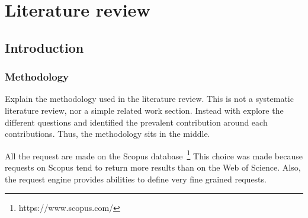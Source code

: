 \chapter{Literature review}



\section*{Introduction}
\subsection{Methodology}
Explain the methodology used in the literature review.
This is not a systematic literature review, nor a simple related work section.
Instead with explore the different questions and identified the prevalent contribution around each contributions.
Thus, the methodology sits in the middle.

All the request are made on the Scopus database~\footnote{https://www.scopus.com/}
This choice was made because requests on Scopus tend to return more results than on the Web of Science.
Also, the request engine provides abilities to define very fine grained requests.

